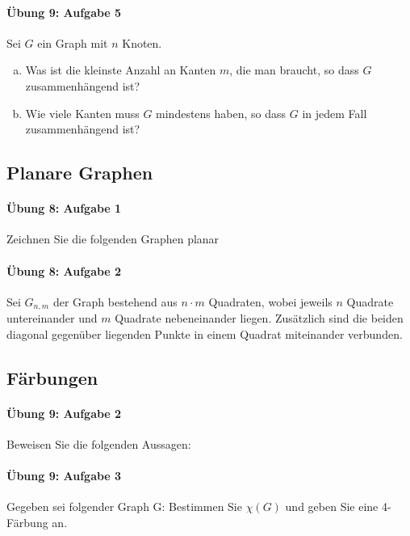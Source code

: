 \documentclass
[
  draft    = true,
  fontsize = 11pt,
  parskip  = half-,
  BCOR     = 0pt,
  DIV      = 11,
  ngerman,
  dvipsnames
]
{scrartcl}
\begin{document}
\paragraph{Übung 9: Aufgabe 5}
Sei $G$ ein Graph mit $n$ Knoten.
\begin{enumerate}[a)]
  \item Was ist die kleinste Anzahl an Kanten $m$, die man braucht, so dass $G$ zusammenhängend ist?
  \item Wie viele Kanten muss $G$ mindestens haben, so dass $G$ in jedem Fall zusammenhängend ist?
\end{enumerate}

\subsection{Planare Graphen}

\paragraph{Übung 8: Aufgabe 1}
Zeichnen Sie die folgenden Graphen planar

\paragraph{Übung 8: Aufgabe 2}
Sei $G_{n,m}$ der Graph bestehend aus $n\cdot m$ Quadraten, wobei jeweils
$n$ Quadrate untereinander und $m$ Quadrate nebeneinander liegen.
Zusätzlich sind die beiden diagonal gegenüber liegenden Punkte in einem
Quadrat miteinander verbunden.

\subsection{Färbungen}

\paragraph{Übung 9: Aufgabe 2}
Beweisen Sie die folgenden Aussagen:

\paragraph{Übung 9: Aufgabe 3}
Gegeben sei folgender Graph G:
Bestimmen Sie $\chi(G)$ und geben Sie eine 4-Färbung an.
\end{document}
